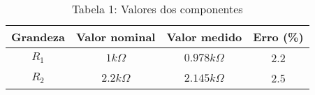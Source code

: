 \vspace{5pt}
\begin{table}[h]
\centering
\begin{tabular}{|c|c|c|c|}
\hline
\textbf{Grandeza} & \textbf{Valor nominal} & \textbf{Valor medido} & \textbf{Erro (\%) }\\\hline
$R_1$ & $1k\Omega$ & $0.978k\Omega$ & 2.2 \\\hline
$R_2$ & $2.2k\Omega$ & $2.145k\Omega$ & 2.5 \\\hline
\end{tabular}
\caption*{Tabela 1: Valores dos componentes}
\end{table}